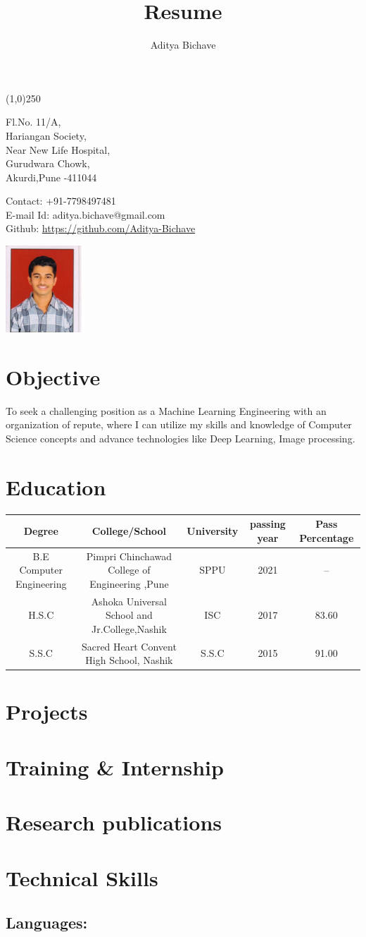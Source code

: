 \documentclass[10pt]{article}
\makeatletter
\renewcommand{\maketitle}{
\begin{center}
{\LARGE\bfseries
\theauthor}

\vspace{.25em}
\line(1,0){250}
\end{center}
\begin{multicols}{2}
\noindent
Fl.No. 11/A,\\
Hariangan Society,\\
Near New Life Hospital,\\
Gurudwara Chowk,\\
Akurdi,Pune -411044\\

\columnbreak
\begin{flushright}
Contact: +91-7798497481\\
E-mail Id: aditya.bichave@gmail.com\\
Github: \url{https://github.com/Aditya-Bichave}
\end{flushright}
\noindent
\hspace{10em}
\includegraphics[width = 8em]{Aditya.jpg}

\end{multicols}



}
\makeatother
\begin{document}
\title{Resume}
\author{Aditya Bichave}
\maketitle

\section{Objective}

To seek a challenging position as a Machine Learning Engineering with an organization of repute, where I can utilize my skills and knowledge of Computer Science concepts and advance technologies like Deep Learning, Image processing.

\section{Education}

\begin{tabular}[8pt]{| c | c | c | c | c |}
\hline
	Degree & College/School & University & passing year & Pass Percentage\\
\hline
	B.E Computer Engineering & Pimpri Chinchawad College of Engineering ,Pune & SPPU & 2021 & -- \\
\hline
	H.S.C & Ashoka Universal School and Jr.College,Nashik & ISC & 2017 & 83.60 \\
\hline
	S.S.C & Sacred Heart Convent High School, Nashik & S.S.C & 2015 & 91.00\\
\hline
\end{tabular} 

\section{Projects}
	


\section{Training \& Internship}

\section{Research publications}

\section{Technical Skills}
	\subsection{Languages:}
\end{document}

